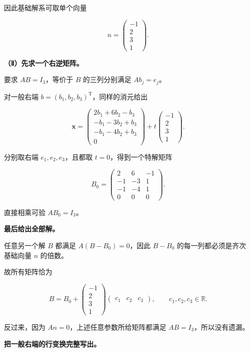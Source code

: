 \documentclass[UTF8,11pt,fontset=windows]{ctexart}
\begin{document}
因此基础解系可取单个向量

$$
n=\begin{pmatrix}-1\\2\\3\\1\end{pmatrix}.
$$

\textbf{（Ⅱ）先求一个右逆矩阵。}

要求 $AB=I_3$，等价于 $B$ 的三列分别满足 $A b_j=e_j$。

对一般右端 $b=(b_1,b_2,b_3)^{\mathrm T}$，同样的消元给出

$$
\boldsymbol x=
\begin{pmatrix}2b_1+6b_2-b_3\\-b_1-3b_2+b_3\\-b_1-4b_2+b_3\\0\end{pmatrix}
+t\begin{pmatrix}-1\\2\\3\\1\end{pmatrix}.
$$

分别取右端 $e_1,e_2,e_3$，且都取 $t=0$，得到一个特解矩阵

$$
B_0=\begin{pmatrix}2&6&-1\\-1&-3&1\\-1&-4&1\\0&0&0\end{pmatrix}.
$$

直接相乘可验 $AB_0=I_3$。

\textbf{最后给出全部解。}

任意另一个解 $B$ 都满足 $A(B-B_0)=0$，因此 $B-B_0$ 的每一列都必须是齐次基础向量 $n$ 的倍数。

故所有矩阵恰为

$$
B=B_0+
\begin{pmatrix}-1\\2\\3\\1\end{pmatrix}
\begin{pmatrix}c_1&c_2&c_3\end{pmatrix},
\qquad c_1,c_2,c_3\in\mathbb R.
$$

反过来，因为 $An=0$，上述任意参数所给矩阵都满足 $AB=I_3$，所以没有遗漏。

\textbf{把一般右端的行变换完整写出。}
\end{document}

